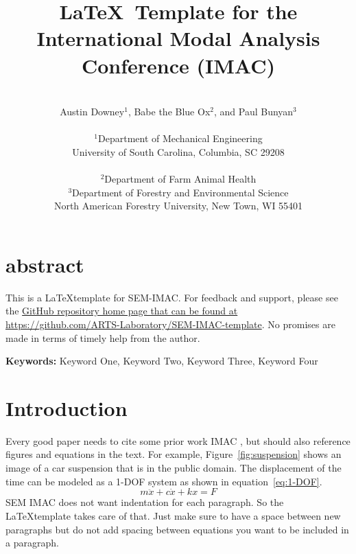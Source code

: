 \documentclass[10pt,letterpaper]{article}
\newcommand{\keywords}[1]{\vspace{2ex} \noindent \textbf{Keywords:} #1}
\begin{document}
\date{} %

\title{\LaTeX\ Template for the International Modal Analysis Conference (IMAC)}

\author{\vspace{.25in}\\
Austin Downey$^1$, Babe the Blue Ox$^2$, and Paul Bunyan$^3$\\ \\ %
 $^1$Department of Mechanical Engineering \\
	University of South Carolina, Columbia, SC 29208 \\ \\ %
 $^2$Department of Farm Animal Health \\
 $^3$Department of Forestry and Environmental Science \\
	North American Forestry University, New Town, WI 55401 \\
}
\maketitle

\section{abstract}
This is a \LaTeX template for SEM-IMAC. For feedback and support, please see the \href{https://github.com/ARTS-Laboratory/SEM-IMAC-template}{GitHub repository home page that can be found at https://github.com/ARTS-Laboratory/SEM-IMAC-template}. No promises are made in terms of timely help from the author. 

\keywords{Keyword One, Keyword Two, Keyword Three, Keyword Four}

\section{Introduction}

Every good paper needs to cite some prior work IMAC \cite{Downey2021OpenVibrations,Ishrat2019RealtimeForecasting,Downey2020Millisecondmodelupdating,Downey2016HighCapacityVariable}, but should also reference figures and equations in the text. For example, Figure~\ref{fig:suspension} shows an image of a car suspension that is in the public domain. The displacement of the time can be modeled as a 1-DOF system as shown in equation~\ref{eq:1-DOF}.
\begin{equation}
m\ddot{x} + c\dot{x} + kx = F
\label{eq:1-DOF}
\end{equation}
SEM IMAC does not want indentation for each paragraph. So the \LaTeX template takes care of that. Just make sure to have a space between new paragraphs but do not add spacing between equations you want to be included in a paragraph. 
\end{document}
